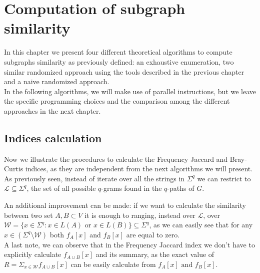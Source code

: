 \chapter{Computation of subgraph similarity}

	In this chapter we present four different theoretical algorithms to compute subgraphs similarity as previously defined: an exhaustive enumeration, two similar randomized approach using the tools described in the previous chapter and a naive randomized approach.\\
	
	In the following algorithms, we will make use of parallel instructions, but we leave the specific programming choices and the comparison among the different approaches in the next chapter.
	
\section{Indices calculation}

Now we illustrate the procedures to calculate the Frequency Jaccard and Bray-Curtis indices, as they are independent from the next algorithms we will present.\\

As previously seen, instead of iterate over all the strings in $\Sigma^{q}$ we can restrict to $\mathcal{L} \subseteq \Sigma^{q}$, the set of all possible $q$-grams found in the $q$-paths of $G$. 

An additional improvement can be made: if we want to calculate the similarity between two set $A, B \subset V$ it is enough to ranging, instead over $\mathcal{L}$, over $\mathcal{W} = \{ x \in \Sigma^{q} : x \in L(A) \text{ or } x \in L(B) \} \subseteq \Sigma^{q}$, as we can easily see that for any $x \in ( \Sigma^{q} \setminus \mathcal{W} )$ both $f_A[x]$ and $f_B[x]$ are equal to zero.\\

A last note, we can observe that in the Frequency Jaccard index we don't have to explicitly calculate $f_{A \cup B}[x]$ and its summary, as the exact value of $R = \Sigma_{x \in \mathcal{W}} f_{A \cup B}[x]$ can be easily calculate from $f_{A}[x] \text{ and } f_{B}[x]$.\\


